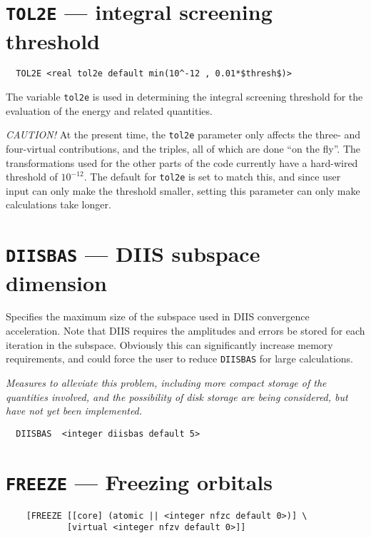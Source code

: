 \section{{\tt TOL2E} --- integral screening threshold}

\begin{verbatim}
  TOL2E <real tol2e default min(10^-12 , 0.01*$thresh$)>
\end{verbatim}

The variable \verb+tol2e+ is used in determining the integral
screening threshold for the evaluation of the energy and related
quantities.

{\em CAUTION!}  At the present time, the \verb+tol2e+ parameter only
affects the three- and four-virtual contributions, and the triples,
all of which are done ``on the fly''. The transformations
used for the other parts of the code currently have a hard-wired
threshold of $10^{-12}$.  The default for \verb+tol2e+ is set to match
this, and since user input can only make the threshold smaller,
setting this parameter can only make calculations take longer.

\section{{\tt DIISBAS} --- DIIS subspace dimension}

Specifies the maximum size of the subspace used in DIIS convergence
acceleration.  Note that DIIS requires the amplitudes and errors be
stored for each iteration in the subspace.  Obviously this can
significantly increase memory requirements, and could force the user
to reduce \verb+DIISBAS+ for large calculations.

{\em Measures to alleviate this problem, including more compact
storage of the quantities involved, and the possibility of disk
storage are being considered, but have not yet been implemented.}

\begin{verbatim}
  DIISBAS  <integer diisbas default 5>
\end{verbatim}

\section{{\tt FREEZE} --- Freezing orbitals}

\begin{verbatim}
    [FREEZE [[core] (atomic || <integer nfzc default 0>)] \
            [virtual <integer nfzv default 0>]]
\end{verbatim}


